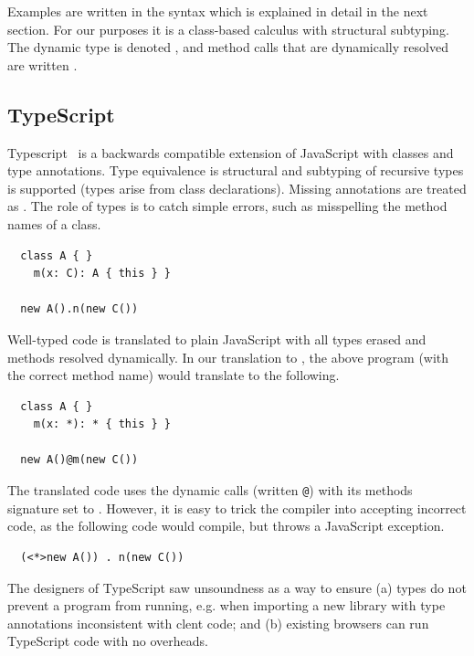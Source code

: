 \documentclass[a4paper,USenglish]{tex/lipics-v2016}
\begin{document}
Examples are written in the \kafka syntax which is explained in detail in
the next section. For our purposes it is a class-based calculus with
structural subtyping. The dynamic type is denoted \any, and method calls
that are dynamically resolved are written \DynCall\x\m\xp.


\newcommand{\code}[1]{{\tt #1}\xspace}

\subsection{TypeScript}

Typescript~\cite{BAT14} is a backwards compatible extension of JavaScript
with classes and type annotations. Type equivalence is structural and
subtyping of recursive types is supported (types arise from class
declarations). Missing annotations are treated as \any. The role of types is
to catch simple errors, such as misspelling the method names of a class.

\begin{lstlisting}
  class A { }
    m(x: C): A { this } }

  new A().n(new C())
\end{lstlisting}

Well-typed code is translated to plain JavaScript with all types erased and
methods resolved dynamically. In our translation to \kafka, the above program
(with the correct method name) would translate to the following.

\begin{lstlisting}
  class A { }
    m(x: *): * { this } }

  new A()@m(new C())
\end{lstlisting}

The translated code uses the dynamic calls (written \code @) with its methods signature
set to \any. However, it is easy to trick the compiler into accepting incorrect
code, as the following code would compile, but throws a JavaScript exception.

\begin{lstlisting}
  (<*>new A()) . n(new C())
\end{lstlisting}

The designers of TypeScript saw unsoundness as a way to ensure (a) types do
not prevent a program from running, e.g. when importing a new library with
type annotations inconsistent with clent code; and (b) existing
browsers can run TypeScript code with no overheads.
\end{document}
